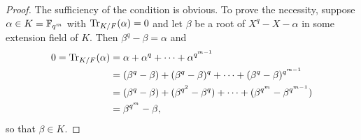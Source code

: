 \begin{proof}
  The sufficiency of the condition is obvious. To prove the necessity, suppose $\alpha\in K=\mathbb{F}_{q^m}$ with $\operatorname{Tr}_{K/F}(\alpha)=0$ and let $\beta$ be a root of $X^q-X-\alpha$ in some extension field of $K$. Then $\beta^q-\beta=\alpha$ and
  \begin{align*}
    0 = \operatorname{Tr}_{K/F}(\alpha) & = \alpha+\alpha^q+\cdots+\alpha^{q^{m-1}}                                    \\
                          & = (\beta^q-\beta)+(\beta^q-\beta)^q+\cdots+(\beta^q-\beta)^{q^{m-1}}         \\
                          & = (\beta^q-\beta)+(\beta^{q^2}-\beta^q)+\cdots+(\beta^{q^m}-\beta^{q^{m-1}}) \\
                          & = \beta^{q^m}-\beta,
  \end{align*}
  so that $\beta\in K$.
\end{proof}


